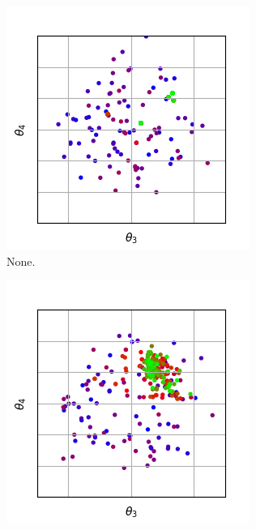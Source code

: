 \documentclass{llncs}
\begin{document}
\begin{figure}[t]
    \begin{subfigure}[t]{0.24\textwidth}
        \centering
        \captionsetup{width=.9\textwidth}
        \includegraphics[width=\textwidth]{figures/recombination/simple_normal-100-10_2-3.png}
        \caption{None.}
        \label{subfig:recomb_none_23}
    \end{subfigure}
    \begin{subfigure}[t]{0.24\textwidth}
        \centering
        \captionsetup{width=.9\textwidth}
        \includegraphics[width=\textwidth]{figures/recombination/simple_normal-100-10_uniform_2-3.png}

\end{subfigure}
\end{figure}
\end{document}

